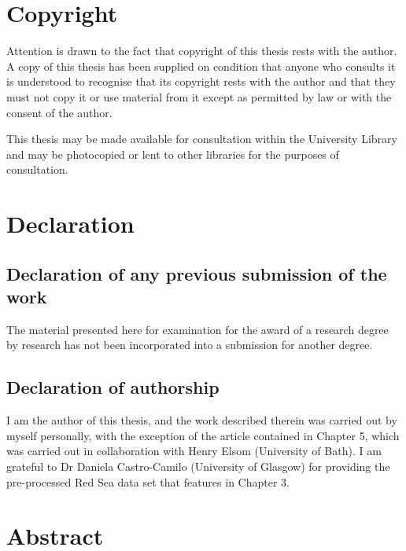 \newpage


\chapter*{Copyright}

Attention is drawn to the fact that copyright of this thesis rests with the author. 
A copy of this thesis has been supplied on condition that anyone who consults it is 
understood to recognise that its copyright rests with the author and that they must 
not copy it or use material from it except as permitted by law or with the consent of the author.

This thesis may be made available for consultation within the University Library and 
may be photocopied or lent to other libraries for the purposes of consultation. 

\newpage

\chapter*{Declaration}

\section*{Declaration of any previous submission of the work}

The material presented here for examination for the award of a research degree by research 
has not been incorporated into a submission for another degree.

\section*{Declaration of authorship}

I am the author of this thesis, and the work described therein was carried out by myself personally, 
with the exception of the article contained in Chapter 5, which was carried out in collaboration with Henry Elsom (University of Bath).
I am grateful to Dr Daniela Castro-Camilo (University of Glasgow) for providing the pre-processed Red Sea data set that features in Chapter 3.

\newpage

\chapter*{Abstract}


